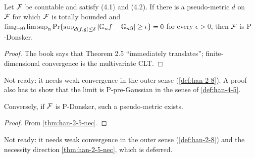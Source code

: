 \begin{theorem}
  \label{thm:han-4-6-if}
  \notready
  Let $\mathcal{F}$ be countable and satisfy (4.1) and (4.2). If there is a pseudo-metric $d$ on $\mathcal{F}$ for which $\mathcal{F}$ is totally bounded and $\lim_{\delta\to0}\limsup_n\Pr\{\sup_{d(f,g)\le\delta}|\mathbb{G}_n f-\mathbb{G}_n g|\ge\epsilon\}=0$ for every $\epsilon>0$, then $\mathcal{F}$ is $\mathrm P$-Donsker.
\end{theorem}
\begin{proof}
  The book says that Theorem 2.5 ``immediately translates''; finite-dimensional convergence is the multivariate CLT.
\end{proof}
\begin{remark}
  Not ready: it needs weak convergence in the outer sense (\cref{def:han-2-8}). A proof also has to show that the limit is $\mathrm P$-pre-Gaussian in the sense of \cref{def:han-4-5}.
\end{remark}

\begin{theorem}
  \label{thm:han-4-6-onlyif}
  \notready
  Conversely, if $\mathcal{F}$ is $\mathrm P$-Donsker, such a pseudo-metric exists.
\end{theorem}
\begin{proof}
  From \cref{thm:han-2-5-nec}.
\end{proof}
\begin{remark}
  Not ready: it needs weak convergence in the outer sense (\cref{def:han-2-8}) and the necessity direction \cref{thm:han-2-5-nec}, which is deferred.
\end{remark}

